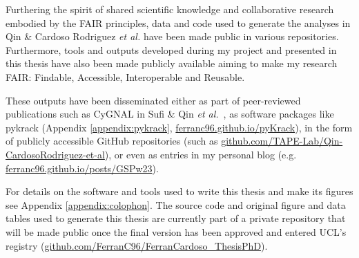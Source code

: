 Furthering the spirit of shared scientific knowledge and collaborative research embodied by the FAIR principles, data and code used to generate the analyses in Qin \& Cardoso Rodriguez \emph{et al.} have been made public in various repositories. Furthermore, tools and outputs developed during my project and presented in this thesis have also been made publicly available aiming to make my research FAIR: Findable, Accessible, Interoperable and Reusable. 

These outputs have been disseminated either as part of peer-reviewed publications such as CyGNAL in Sufi \& Qin \emph{et al.}~\cite{sufi_multiplexed_2021}, as software packages like pykrack (Appendix \ref{appendix:pykrack}, \url{ferranc96.github.io/pyKrack}), in the form of publicly accessible GitHub repositories (such as \url{github.com/TAPE-Lab/Qin-CardosoRodriguez-et-al}), or even as entries in my personal blog (e.g. \url{ferranc96.github.io/posts/GSPw23}). 

For details on the software and tools used to write this thesis and make its figures see Appendix \ref{appendix:colophon}. The source code and original figure and data tables used to generate this thesis are currently part of a private repository that will be made public once the final version has been approved and entered UCL's registry (\url{github.com/FerranC96/FerranCardoso_ThesisPhD}).












        
        
